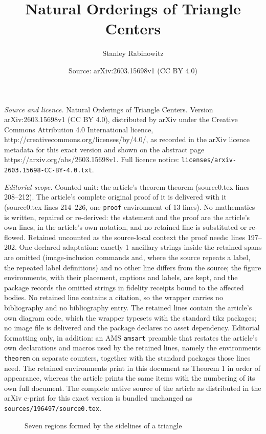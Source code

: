 \documentclass[10pt,a4paper]{amsart}
\title{Natural Orderings of Triangle Centers}
\author{Stanley Rabinowitz}
\date{Source: arXiv:2603.15698v1 (CC BY 4.0)}
\begin{document}
\maketitle

\noindent\emph{Source and licence.} Natural Orderings of Triangle Centers. Version arXiv:2603.15698v1 (CC BY 4.0), distributed by arXiv under the Creative Commons Attribution 4.0 International licence, http://creativecommons.org/licenses/by/4.0/, as recorded in the arXiv licence metadata for this exact version and shown on the abstract page https://arxiv.org/abs/2603.15698v1. Full licence notice: \texttt{licenses/arxiv-2603.15698-CC-BY-4.0.txt}.\par\smallskip

\noindent\textit{Editorial scope.} Counted unit: the article's theorem theorem (source0.tex lines 208--212). The article's complete original proof of it is delivered with it (source0.tex lines 214--226, one \texttt{proof} environment of 13 lines). No mathematics is written, repaired or re-derived: the statement and the proof are the article's own lines, in the article's own notation, and no retained line is substituted or re-flowed.  Retained uncounted as the source-local context the proof needs: lines 197--202.  One declared adaptation: exactly 1 ancillary strings inside the retained spans are omitted (image-inclusion commands and, where the source repeats a label, the repeated label definitions) and no other line differs from the source; the figure environments, with their placement, captions and labels, are kept, and the package records the omitted strings in fidelity receipts bound to the affected bodies.  No retained line contains a citation, so the wrapper carries no bibliography and no bibliography entry.  The retained lines contain the article's own diagram code, which the wrapper typesets with the standard tikz packages; no image file is delivered and the package declares no asset dependency.  Editorial formatting only, in addition: an AMS \texttt{amsart} preamble that restates the article's own declarations and macros used by the retained lines, namely the environments \texttt{theorem} on separate counters, together with the standard packages those lines need.  The retained environments print in this document as Theorem 1 in order of appearance, whereas the article prints the same items with the numbering of its own full document.  The complete native source of the article as distributed in the arXiv e-print for this exact version is bundled unchanged as \texttt{sources/196497/source0.tex}.
\begin{figure}[h!t]
\centering

\caption{Seven regions formed by the sidelines of a triangle}
\label{fig:7areas}
\end{figure}
\end{document}
